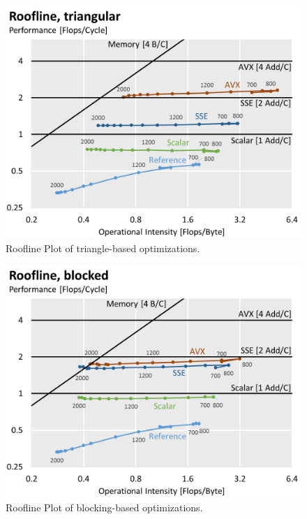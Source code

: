 \begin{figure}[htb]\centering
  \includegraphics[width=\linewidth]{roofline-data/roofline_triangular.png}
  \caption{Roofline Plot of triangle-based optimizations.}
  \label{fig:roofline-triangular}
\end{figure}
\begin{figure}[htb]\centering
  \includegraphics[width=\linewidth]{roofline-data/roofline_blocked.png}
  \caption{Roofline Plot of blocking-based optimizations.}
  \label{fig:roofline-blocked}
\end{figure}
